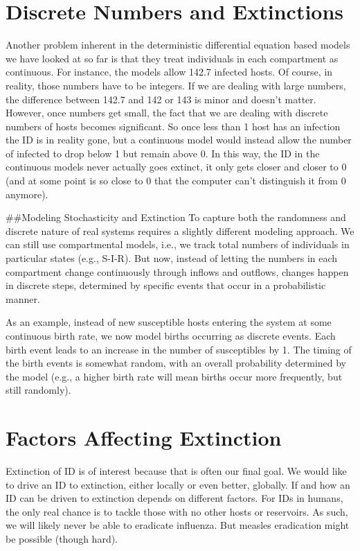 \documentclass[]{book}
\theoremstyle{definition}
\theoremstyle{definition}
\theoremstyle{definition}
\theoremstyle{remark}
\begin{document}
\hypertarget{discrete-numbers-and-extinctions}{%
\section{Discrete Numbers and
Extinctions}\label{discrete-numbers-and-extinctions}}

Another problem inherent in the deterministic differential equation
based models we have looked at so far is that they treat individuals in
each compartment as continuous. For instance, the models allow 142.7
infected hosts. Of course, in reality, those numbers have to be
integers. If we are dealing with large numbers, the difference between
142.7 and 142 or 143 is minor and doesn't matter. However, once numbers
get small, the fact that we are dealing with discrete numbers of hosts
becomes significant. So once less than 1 host has an infection the ID is
in reality gone, but a continuous model would instead allow the number
of infected to drop below 1 but remain above 0. In this way, the ID in
the continuous models never actually goes extinct, it only gets closer
and closer to 0 (and at some point is so close to 0 that the computer
can't distinguish it from 0 anymore).

\#\#Modeling Stochasticity and Extinction To capture both the randomness
and discrete nature of real systems requires a slightly different
modeling approach. We can still use compartmental models, i.e., we track
total numbers of individuals in particular states (e.g., S-I-R). But
now, instead of letting the numbers in each compartment change
continuously through inflows and outflows, changes happen in discrete
steps, determined by specific events that occur in a probabilistic
manner.

As an example, instead of new susceptible hosts entering the system at
some continuous birth rate, we now model births occurring as discrete
events. Each birth event leads to an increase in the number of
susceptibles by 1. The timing of the birth events is somewhat random,
with an overall probability determined by the model (e.g., a higher
birth rate will mean births occur more frequently, but still randomly).

\hypertarget{factors-affecting-extinction}{%
\section{Factors Affecting
Extinction}\label{factors-affecting-extinction}}

Extinction of ID is of interest because that is often our final goal. We
would like to drive an ID to extinction, either locally or even better,
globally. If and how an ID can be driven to extinction depends on
different factors. For IDs in humans, the only real chance is to tackle
those with no other hosts or reservoirs. As such, we will likely never
be able to eradicate influenza. But measles eradication might be
possible (though hard).
\end{document}
